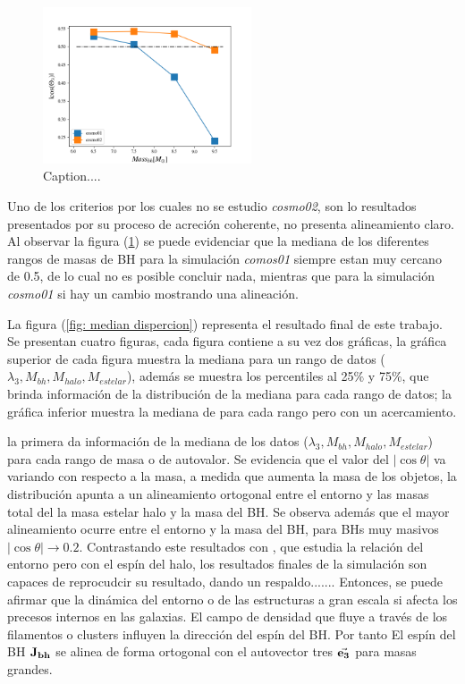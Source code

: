 \begin{figure}
    \centering
    \includegraphics[width=0.55\textwidth]{./figures/6_Resultados/cosmo01/percentiles/relacion_simulaciones_Mass_bh}
    \caption{Caption....}
    \label{fig: comparacion cosmo01 y cosmo02}
\end{figure}
 
Uno de los criterios por los cuales no se estudio {\it{cosmo02}}, son lo resultados presentados por su proceso de acreción coherente, no presenta alineamiento claro. Al observar la figura (\ref{fig: comparacion cosmo01 y cosmo02}) se puede evidenciar que la mediana de los diferentes rangos de masas de BH para la simulación {\it{comos01}} siempre estan muy cercano de 0.5, de lo cual no es posible concluir nada, mientras que para la simulación {\it{cosmo01}} si hay un cambio mostrando una alineación. 

La figura (\ref{fig: median dispercion}) representa el resultado final de este trabajo. Se presentan cuatro  figuras, cada figura contiene a su vez dos gráficas, la gráfica superior de cada figura muestra la mediana para un rango de datos ($\lambda_{3}, M_{bh}, M_{halo}, M_{estelar}$), además se muestra los percentiles al 25$\%$ y 75$\%$, que brinda información de la distribución de la mediana para cada rango de datos; la gráfica inferior muestra la mediana de para cada rango pero con un acercamiento. 

la primera da información de la mediana de los datos ($\lambda_{3}, M_{bh}, M_{halo}, M_{estelar}$) para cada rango de masa o de autovalor. Se evidencia que el valor del $|\cos \theta|$ va variando con respecto a la masa, a medida que aumenta la masa de los objetos, la distribución apunta a un alineamiento ortogonal entre el entorno y las masas total del la masa estelar halo y la masa del BH.  Se observa además que el mayor alineamiento ocurre entre el entorno y la masa del BH, para BHs muy masivos $|\cos\theta| \to 0.2$. Contrastando este resultados con \cite{wang2018}, que estudia la relación del entorno pero con el espín del halo, los resultados finales de la simulación son capaces de reprocudcir su resultado, dando un respaldo.......
Entonces, se puede afirmar que la dinámica del entorno o de las  estructuras a gran escala si afecta los precesos internos en las galaxias. El campo de densidad que fluye a través de los filamentos o clusters influyen la dirección del espín del BH. Por tanto El espín del BH ${\bf{J_{bh}}}$ se alinea de forma ortogonal con el autovector tres $\vec{\bf{e}_3}$ para masas grandes. 
%

